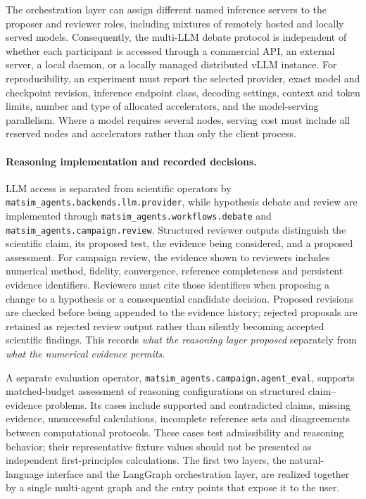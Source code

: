 \documentclass[11pt,a4paper]{article}
\begin{document}
The orchestration layer can assign different named inference servers to the proposer and reviewer roles, including mixtures of remotely hosted and locally served models. Consequently, the multi-LLM debate protocol is independent of whether each participant is accessed through a commercial API, an external server, a local daemon, or a locally managed distributed vLLM instance. For reproducibility, an experiment must report the selected provider, exact model and checkpoint revision, inference endpoint class, decoding settings, context and token limits, number and type of allocated accelerators, and the model-serving parallelism. Where a model requires several nodes, serving cost must include all reserved nodes and accelerators rather than only the client process.

\paragraph{Reasoning implementation and recorded decisions.}
LLM access is separated from scientific operators by \texttt{matsim\_agents.backends.llm.provider}, while hypothesis debate and review are implemented through \texttt{matsim\_agents.workflows.debate} and \texttt{matsim\_agents.campaign.review}. Structured reviewer outputs distinguish the scientific claim, its proposed test, the evidence being considered, and a proposed assessment. For campaign review, the evidence shown to reviewers includes numerical method, fidelity, convergence, reference completeness and persistent evidence identifiers. Reviewers must cite those identifiers when proposing a change to a hypothesis or a consequential candidate decision. Proposed revisions are checked before being appended to the evidence history; rejected proposals are retained as rejected review output rather than silently becoming accepted scientific findings. This records \emph{what the reasoning layer proposed} separately from \emph{what the numerical evidence permits}.

A separate evaluation operator, \texttt{matsim\_agents.campaign.agent\_eval}, supports matched-budget assessment of reasoning configurations on structured claim--evidence problems. Its cases include supported and contradicted claims, missing evidence, unsuccessful calculations, incomplete reference sets and disagreements between computational protocols. These cases test admissibility and reasoning behavior; their representative fixture values should not be presented as independent first-principles calculations.
The first two layers, the natural-language interface
and the LangGraph orchestration layer, are realized together by a single
multi-agent graph and the entry points that expose it to the user.
\end{document}

